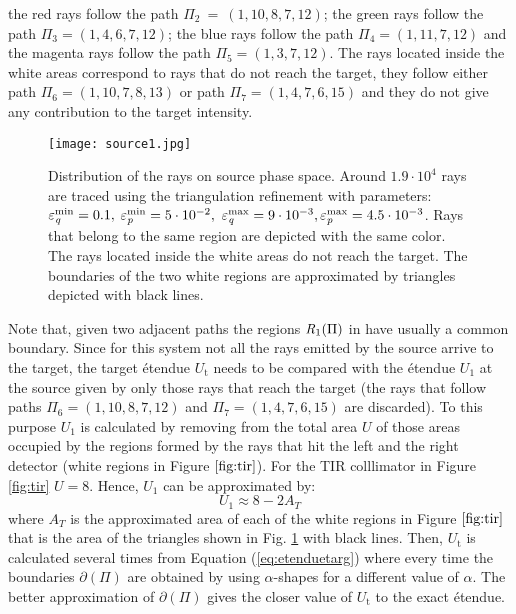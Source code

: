    the red rays follow the path $\Pi_2 ~= ~(1, 10, 8, 7, 12)$; the green rays follow the path $\Pi_3 = (1, 4, 6, 7, 12)$;
   the blue rays follow the path $\Pi_4= (1, 11, 7, 12)$ and the magenta rays follow the path $\Pi_5= (1, 3, 7, 12)$. The rays located inside the white areas correspond to rays that do not reach the target, they follow either path $\Pi_6 = (1, 10, 7, 8, 13)$ or path $\Pi_7 = (1,4,7,6,15)$ and they do not give any contribution to the target intensity.
\begin{figure}[h]
  \begin{center}
  \texttt{[image: source1.jpg]}
  \end{center}
  \caption{Distribution of the rays on source phase space. Around $1.9 \cdot 10^4$ rays are traced using the triangulation refinement with parameters:
  $\varepsilon_{\textit{q}}^\textrm{min} = 0.1 ,$ $ \varepsilon_{\textit{p}}^\textrm{min} = 5\cdot 10^{-2}, $ $\varepsilon_{\textit{q}}^\textrm{max} = 9\cdot 10^{-3}, \varepsilon_{\textit{p}}^\textrm{max} = 4.5 \cdot 10^{-3}$. Rays that belong to the same region are depicted with the same color. The rays located inside the white areas do not reach the target. The boundaries of the two white regions are approximated by triangles depicted with black lines.}
  \label{fig:sourcePS}
\end{figure}
Note that, given two adjacent paths the regions $\mbox{$\emph{R}_{\textit{$1$}}$}(\Pi)$ in  have usually a common boundary. 
Since for this system not all the rays emitted by the source arrive to the target, the target \'{e}tendue $U_{\textrm{t}}$ needs to be compared with the \'{e}tendue $U_1$ at the source given by only those rays that reach the target (the rays that follow paths $\Pi_6=(1,10,8,7,12)$ and 
$\Pi_7 = (1,4,7,6,15)$ are discarded). To this purpose $U_1$ is calculated by removing from the total area $U$ of  those areas occupied by the regions formed by the rays that hit the left and the right detector (white regions in Figure $\ref{fig:tir}$).  For the TIR colllimator in Figure \ref{fig:tir} $U = 8$. Hence, $U_1$ can be approximated by:
 \begin{equation}
 U_{1}\approx 8-2A_{T}
 \end{equation}
 where $A_{T}$ is the approximated area of each of the white regions in Figure $\ref{fig:tir}$ that is the area of the triangles shown in Fig. \ref{fig:sourcePS} with black lines. Then, $U_{\textrm{t}}$ is calculated several times from Equation (\ref{eq:etenduetarg}) where every time the boundaries $\partial$$(\Pi)$ are obtained by using $\alpha$-shapes for a different value of $\alpha$. The better approximation of $\partial$$(\Pi)$ gives the closer value of $U_{\textrm{t}}$ to the exact \'{e}tendue. 
